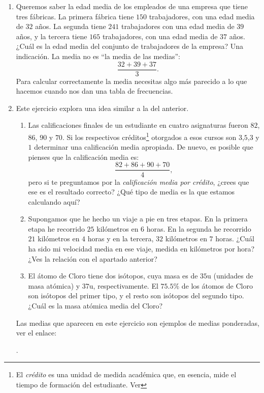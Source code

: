 \documentclass[10pt,a4paper]{article}\usepackage[]{graphicx}\usepackage[]{color}
\begin{document}
\begin{enumerate}
  \addtocounter{enumi}{10}
  \item Queremos saber la edad media de los empleados de una empresa que tiene tres fábricas. La primera fábrica tiene $150$ trabajadores, con una edad media de $32$ años. La segunda tiene $241$ trabajadores con una edad media de $39$ años, y la tercera tiene $165$ trabajadores, con una edad media de $37$ años.  ¿Cuál es la edad media del conjunto de trabajadores de la empresa? Una indicación. La media no es ``la media de las medias'':
      \[\dfrac{32 + 39 + 37}{3}.\]
      Para calcular correctamente la media necesitas algo más parecido a lo que hacemos cuando nos dan una tabla de frecuencias.
  \item Este ejercicio explora una idea similar a la del anterior.
  \begin{enumerate}
    \item   Las calificaciones finales de un estudiante en cuatro asignaturas fueron $82$, $86$, $90$ y $70$. Si los respectivos créditos\footnote{El {\em crédito} es una unidad de medida académica que, en esencia, mide el tiempo de formación del estudiante. Ver } otorgados a esos cursos son $3$,$5$,$3$ y $1$ determinar una calificación media apropiada. De nuevo, es posible que pienses que la calificación media es:
      \[\dfrac{82 + 86 + 90 + 70}{4},\]
      pero si te preguntamos por la {\em calificación media por crédito}, ¿crees que ese es el resultado correcto? ¿Qué tipo de media es la que estamos calculando aquí?

    \item Supongamos que he hecho un viaje a pie en tres etapas. En la primera etapa he recorrido $25$ kilómetros en $6$ horas. En la segunda he recorrido $21$ kilómetros en $4$ horas y en la tercera, $32$ kilómetros en $7$ horas. ¿Cuál ha sido mi velocidad media en ese viaje, medida en kilómetros por hora? ¿Ves la relación con el apartado anterior?

    \item El átomo de Cloro tiene dos isótopos, cuya masa es de $35$u (unidades de masa atómica) y $37$u, respectivamente. El $75.5\%$ de los átomos de Cloro son isótopos del primer tipo, y el resto son isótopos del segundo tipo. ¿Cuál es la masa atómica media del Cloro?
  \end{enumerate}
  Las medias que aparecen en este ejercicio son ejemplos de {\sf medias ponderadas}, ver el enlace:
  \begin{center}
  .
  \end{center}


\end{enumerate}
\end{document}
